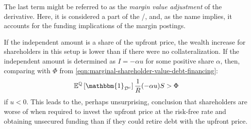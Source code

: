 \documentclass[../main.tex]{subfiles}
\begin{document}
        The last term might be referred to as the \textit{margin value adjustment} of the derivative.
        Here, it is considered a part of the \FVA/, and, 
        as the name implies, it accounts for the funding implications of the margin postings.

        If the independent amount is a share of the upfront price, 
        the wealth increase for shareholders in this setup is lower than
        if there were no collateralization. 
        If the independent amount is determined as $I=-\alpha u$ for some positive share $\alpha$, 
        then, comparing with $\Phi$ from \cref*{eqn:marginal-shareholder-value-debt-financing}:
        \begin{equation}
            \mathbb{E}^{\mathbb{Q}}\left[
                \mathbbm{1}_{\mathcal{D}^{c}}
            \right] \discountfactor (-\alpha u) S
            >
            \Phi
        \end{equation}
        if $u<0$.
        This leads to the, perhaps unsurprising, conclusion
        that shareholders are worse of when required to invest the upfront price at the risk-free rate
        and obtaining unsecured funding
        than if they could retire debt with the upfront price.
\end{document}
